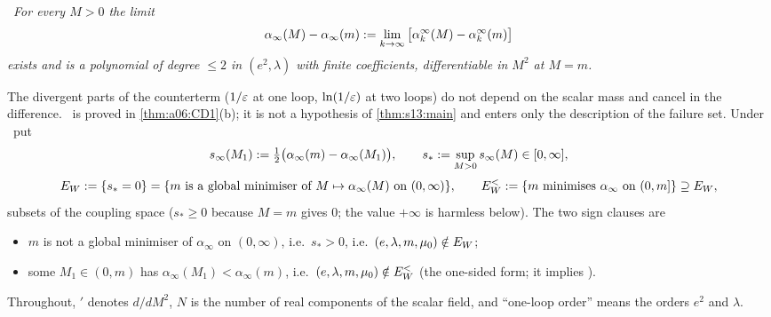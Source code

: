 \smallskip\noindent\sxivCT\ \emph{For every $M>0$ the limit
\[
\alpha_\infty(M)-\alpha_\infty(m):=\lim_{k\to\infty}\big[\alpha^\infty_k(M)-\alpha^\infty_k(m)\big]
\]
exists and is a polynomial of degree $\le2$ in $(e^2,\lambda)$ with finite coefficients, differentiable in $M^2$ at $M=m$.}

\smallskip\noindent The divergent parts of the counterterm ($1/\varepsilon$ at one loop, $\ln(1/\varepsilon)$ at two loops) do not depend on the scalar mass and cancel in the difference. \sxivCT\ is proved in \cref{thm:a06:CD1}(b); it is not a hypothesis of \cref{thm:s13:main} and enters only the description of the failure set. Under \sxivCT\ put
\[
s_\infty(M_1):=\tfrac12\big(\alpha_\infty(m)-\alpha_\infty(M_1)\big),\qquad s_*:=\sup_{M>0}s_\infty(M)\in[0,\infty],
\]
\[
E_W:=\{s_*=0\}=\{m\text{ is a global minimiser of }M\mapsto\alpha_\infty(M)\text{ on }(0,\infty)\},\qquad
E^<_W:=\{m\text{ minimises }\alpha_\infty\text{ on }(0,m]\}\supseteq E_W,
\]
subsets of the coupling space ($s_*\ge0$ because $M=m$ gives $0$; the value $+\infty$ is harmless below). The two sign clauses are
\begin{itemize}[nosep,leftmargin=*]
\item[\sxivNE] $m$ is not a global minimiser of $\alpha_\infty$ on $(0,\infty)$, i.e.\ $s_*>0$, i.e.\ $(e,\lambda,m,\mu_0)\notin E_W$;
\item[\sxivNEl] some $M_1\in(0,m)$ has $\alpha_\infty(M_1)<\alpha_\infty(m)$, i.e.\ $(e,\lambda,m,\mu_0)\notin E^<_W$ (the one-sided form; it implies \sxivNE).
\end{itemize}
Throughout, $'$ denotes $d/dM^2$, $N$ is the number of real components of the scalar field, and ``one-loop order'' means the orders $e^2$ and $\lambda$.

